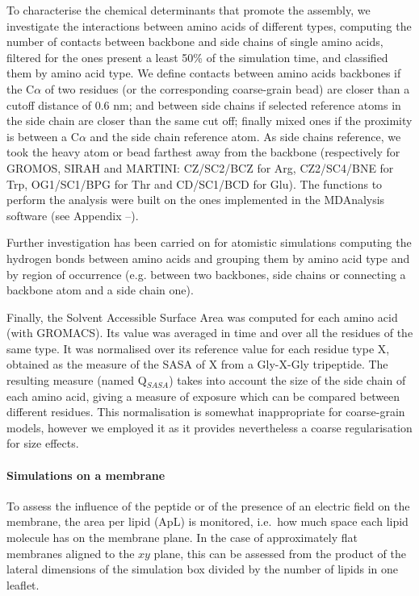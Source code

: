 To characterise the chemical determinants that promote the assembly, we investigate the interactions between amino acids of different types, computing the number of contacts between backbone and side chains of single amino acids, filtered for the ones present a least 50\% of the simulation time, and classified them by amino acid type.
%
We define contacts between amino acids backbones if the C$\alpha$ of two residues (or the corresponding coarse-grain bead) are closer than a cutoff distance of 0.6 nm; and between side chains if selected reference atoms in the side chain are closer than the same cut off; finally mixed ones if the proximity is between a C$\alpha$ and the side chain reference atom. As side chains reference, we took the heavy atom or bead farthest away from the backbone (respectively for GROMOS, SIRAH and MARTINI: CZ/SC2/BCZ for Arg, CZ2/SC4/BNE for Trp, OG1/SC1/BPG for Thr and CD/SC1/BCD for Glu). The functions to perform the analysis were built on the ones implemented in the MDAnalysis software (see Appendix --).

Further investigation has been carried on for atomistic simulations computing the hydrogen bonds between amino acids and grouping them by amino acid type and by region of occurrence (e.g. between two backbones, side chains or connecting a backbone atom and a side chain one).

Finally, the Solvent Accessible Surface Area was computed for each amino acid (with GROMACS). Its value was averaged in time and over all the residues of the same type. It was normalised over its reference value for each residue type X, obtained as the measure of the SASA of X from a Gly-X-Gly tripeptide. The resulting measure (named Q$_{SASA}$) takes into account the size of the side chain of each amino acid, giving a measure of exposure which can be compared between different residues. 
%
This normalisation is somewhat inappropriate for coarse-grain models, however we employed it as it provides nevertheless a coarse regularisation for size effects.


\paragraph{Simulations on a membrane}
To assess the influence of the peptide or of the presence of an electric field on the membrane, the area per lipid (ApL) is monitored, i.e.\ how much space each lipid molecule has on the membrane plane. In the case of approximately flat membranes aligned to the $xy$ plane, this can be assessed from the product of the lateral dimensions of the simulation box divided by the number of lipids in one leaflet.

